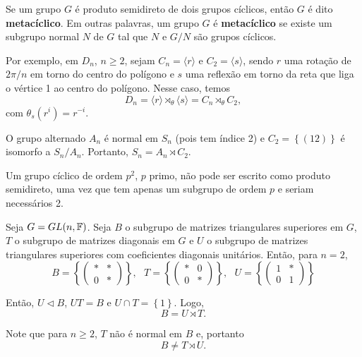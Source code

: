 	Se um grupo $G$ é produto semidireto de dois grupos cíclicos, então 
	$G$ é dito \textbf{metacíclico}. Em outras palavras, um grupo $G$ é \textbf{metacíclico} 
	se existe um subgrupo normal $N$ de $G$ tal que $N$ e $G/N$ são grupos cíclicos.
	\begin{example}
	Por exemplo, em $D_n$, $n\geq2$, sejam $C_n = \langle r \rangle$ e 
	$C_2 = \langle s \rangle$, sendo $r$ uma rotação de $2\pi/n$ em torno do centro do polígono 
	e $s$ uma reflexão em torno da reta que liga o vértice 1 ao centro do polígono. Nesse caso, temos
	\begin{equation*}
	    D_n = \langle r \rangle \rtimes_{\theta} \langle s \rangle = C_n\rtimes_{\theta}C_2,
	\end{equation*}
	com $\theta_s(r^i) = r^{-i}$.
	\end{example}
	\begin{example}
	O grupo alternado $A_n$ é normal em $S_n$ (pois tem índice 2) e 
	$C_2 = \left\{ (12) \right\}$ é isomorfo a $S_n/A_n$. Portanto, $S_n = A_n\rtimes C_2$.
	\end{example}
	\begin{example}
	Um grupo cíclico de ordem $p^2$, $p$ primo, não pode ser escrito como 
	produto semidireto, uma vez que tem apenas um subgrupo de ordem $p$ e seriam necessários 2.
	\end{example}
	\begin{example}
	Seja $G = GL(n,\mathbb{F})$. Seja $B$ o subgrupo de matrizes triangulares superiores 
	em $G$, $T$ o subgrupo de matrizes diagonais em $G$ e $U$ o subgrupo de matrizes triangulares 
	superiores com coeficientes diagonais unitários. Então, para $n=2$,
	\begin{equation*}
	    B = \left\{ \left(\begin{array}{cc}
        	\ast & \ast \\
        	0 & \ast 
        	\end{array} \right) \right\}, \text{ } 
        T = \left\{ \left(\begin{array}{cc}
        	\ast & 0 \\
        	0 & \ast 
        	\end{array} \right) \right\}, \text{ }
        U = \left\{ \left(\begin{array}{cc}
        	1 & \ast \\
        	0 & 1 
        	\end{array} \right) \right\}
	\end{equation*}
	\par\vspace{0.3cm} Então, $U\vartriangleleft B$, $UT=B$ e $U\cap T = \left\{1\right\}$. Logo,
	\begin{equation*}
	    B = U\rtimes T.
	\end{equation*}
	\par\vspace{0.3cm} Note que para $n\geq 2$, $T$ não é normal em $B$ e, portanto
	\begin{equation*}
	    B\neq T\rtimes U.
	\end{equation*}
	\end{example}
